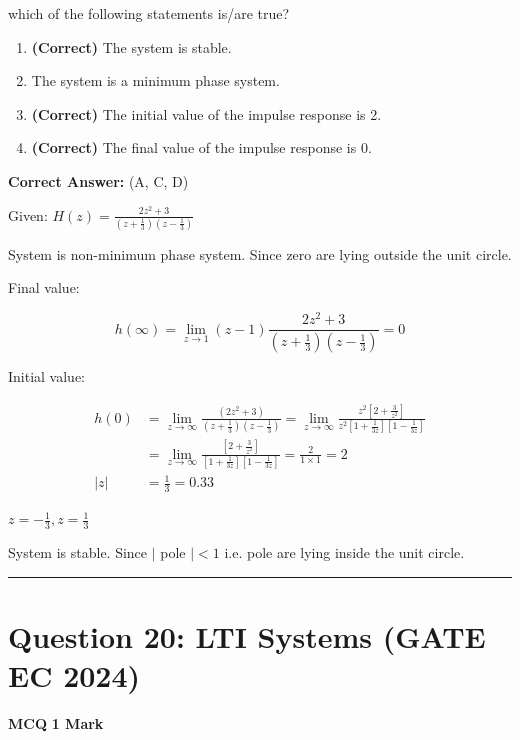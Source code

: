 \documentclass[11pt,a4paper]{article}
\begin{document}
which of the following statements is/are true?


\begin{enumerate}[label=(\Alph*)]
    \item \textbf{(Correct)} The system is stable.
    \item The system is a minimum phase system.
    \item \textbf{(Correct)} The initial value of the impulse response is 2.
    \item \textbf{(Correct)} The final value of the impulse response is 0.
\end{enumerate}

\noindent \textbf{Correct Answer:} (A, C, D)

\begin{tcolorbox}[solbox, title=Detailed Solution -- Question 19]
Given: $H(z)=\frac{2 z^{2}+3}{\left(z+\frac{1}{3}\right)\left(z-\frac{1}{3}\right)}$

System is non-minimum phase system. Since zero are lying outside the unit circle.

Final value:

 
\[
h(\infty)=\lim _{z \rightarrow 1}(z-1) \frac{2 z^{2}+3}{\left(z+\frac{1}{3}\right)\left(z-\frac{1}{3}\right)}=0
\]

Initial value:

 
\[
\begin{aligned}
h(0) & =\lim _{z \rightarrow \infty} \frac{\left(2 z^{2}+3\right)}{\left(z+\frac{1}{3}\right)\left(z-\frac{1}{3}\right)}=\lim _{z \rightarrow \infty} \frac{z^{2}\left[2+\frac{3}{z^{2}}\right]}{z^{2}\left[1+\frac{1}{3 z}\right]\left[1-\frac{1}{3 z}\right]} \\
& =\lim _{z \rightarrow \infty} \frac{\left[2+\frac{3}{z^{2}}\right]}{\left[1+\frac{1}{3 z}\right]\left[1-\frac{1}{3 z}\right]}=\frac{2}{1 \times 1}=2 \\
|z| & =\frac{1}{3}=0.33
\end{aligned}
\]

$z=-\frac{1}{3}, z=\frac{1}{3}$

System is stable. Since $\mid$ pole $\mid < 1$ i.e. pole are lying inside the unit circle.
\end{tcolorbox}

\vspace{1.5em}
\hrule
\vspace{1.5em}

\section*{Question 20: LTI Systems (GATE EC 2024)}
\noindent \textbf{\color{primary}MCQ} \hfill \textbf{\color{secondary}1 Mark}
\end{document}
